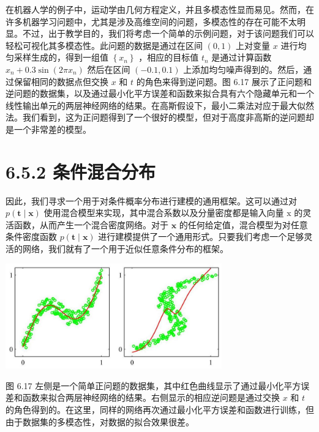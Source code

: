 \documentclass[10pt]{article}
\begin{document}
在机器人学的例子中，运动学由几何方程定义，并且多模态性显而易见。然而，在许多机器学习问题中，尤其是涉及高维空间的问题，多模态性的存在可能不太明显。不过，出于教学目的，我们将考虑一个简单的示例问题，对于该问题我们可以轻松可视化其多模态性。此问题的数据是通过在区间 \(\left( {0,1}\right)\) 上对变量 \(x\) 进行均匀采样生成的，得到一组值 \(\left\{  {x}_{n}\right\}\) ，相应的目标值 \({t}_{n}\) 是通过计算函数 \({x}_{n} + {0.3}\sin \left( {{2\pi }{x}_{n}}\right)\) 然后在区间 \(\left( {-{0.1},{0.1}}\right)\) 上添加均匀噪声得到的。然后，通过保留相同的数据点但交换 \(x\) 和 \(t\) 的角色来得到逆问题。图 6.17 展示了正问题和逆问题的数据集，以及通过最小化平方误差和函数来拟合具有六个隐藏单元和一个线性输出单元的两层神经网络的结果。在高斯假设下，最小二乘法对应于最大似然法。我们看到，这为正问题得到了一个很好的模型，但对于高度非高斯的逆问题却是一个非常差的模型。

\section*{6.5.2 条件混合分布}

因此，我们寻求一个用于对条件概率分布进行建模的通用框架。这可以通过对 \(p\left( {\mathbf{t} \mid  \mathbf{x}}\right)\) 使用混合模型来实现，其中混合系数以及分量密度都是输入向量 \(\mathrm{x}\) 的灵活函数，从而产生一个混合密度网络。对于 \(\mathbf{x}\) 的任何给定值，混合模型为对任意条件密度函数 \(p\left( {\mathbf{t} \mid  \mathbf{x}}\right)\) 进行建模提供了一个通用形式。只要我们考虑一个足够灵活的网络，我们就有了一个用于近似任意条件分布的框架。

\begin{center}
\includegraphics[max width=0.7\textwidth]{images/0194e279-9b28-703a-88f4-c3ac21e2010d_218_665_1562_872_424_0.jpg}
\end{center}
\hspace*{3em} 

图 6.17 左侧是一个简单正问题的数据集，其中红色曲线显示了通过最小化平方误差和函数来拟合两层神经网络的结果。右侧显示的相应逆问题是通过交换 \(x\) 和 \(t\) 的角色得到的。在这里，同样的网络再次通过最小化平方误差和函数进行训练，但由于数据集的多模态性，对数据的拟合效果很差。
\end{document}
